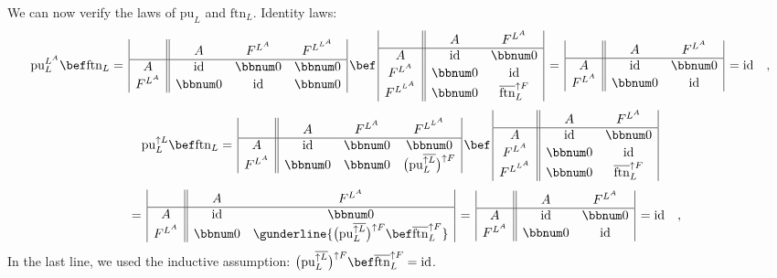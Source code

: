 We can now verify the laws of $\text{pu}_{L}$ and $\text{ftn}_{L}$.
Identity laws:
\[
\text{pu}_{L}^{L^{A}}\bef\text{ftn}_{L}=\,\begin{array}{|c||ccc|}
 & A & F^{L^{A}} & F^{L^{L^{A}}}\\
\hline A & \text{id} & \bbnum 0 & \bbnum 0\\
F^{L^{A}} & \bbnum 0 & \text{id} & \bbnum 0
\end{array}\,\bef\,\begin{array}{|c||cc|}
 & A & F^{L^{A}}\\
\hline A & \text{id} & \bbnum 0\\
F^{L^{A}} & \bbnum 0 & \text{id}\\
F^{L^{L^{A}}} & \bbnum 0 & \overline{\text{ftn}}_{L}^{\uparrow F}
\end{array}\,=\,\begin{array}{|c||cc|}
 & A & F^{L^{A}}\\
\hline A & \text{id} & \bbnum 0\\
F^{L^{A}} & \bbnum 0 & \text{id}
\end{array}\,=\text{id}\quad,
\]
\[
\text{pu}_{L}^{\uparrow L}\bef\text{ftn}_{L}=\,\begin{array}{|c||ccc|}
 & A & F^{L^{A}} & F^{L^{L^{A}}}\\
\hline A & \text{id} & \bbnum 0 & \bbnum 0\\
F^{L^{A}} & \bbnum 0 & \bbnum 0 & \big(\text{pu}_{L}^{\overline{\uparrow L}}\big)^{\uparrow F}
\end{array}\,\bef\,\begin{array}{|c||cc|}
 & A & F^{L^{A}}\\
\hline A & \text{id} & \bbnum 0\\
F^{L^{A}} & \bbnum 0 & \text{id}\\
F^{L^{L^{A}}} & \bbnum 0 & \overline{\text{ftn}}_{L}^{\uparrow F}
\end{array}
\]
\[
\quad=\,\begin{array}{|c||cc|}
 & A & F^{L^{A}}\\
\hline A & \text{id} & \bbnum 0\\
F^{L^{A}} & \bbnum 0 & \gunderline{\big(\text{pu}_{L}^{\overline{\uparrow L}}\big)^{\uparrow F}\bef\overline{\text{ftn}}_{L}^{\uparrow F}}
\end{array}\,=\,\begin{array}{|c||cc|}
 & A & F^{L^{A}}\\
\hline A & \text{id} & \bbnum 0\\
F^{L^{A}} & \bbnum 0 & \text{id}
\end{array}\,=\text{id}\quad,
\]
In the last line, we used the inductive assumption: $\big(\text{pu}_{L}^{\overline{\uparrow L}}\big)^{\uparrow F}\bef\overline{\text{ftn}}_{L}^{\uparrow F}=\text{id}$.

